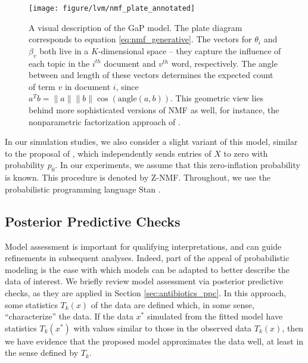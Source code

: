 \begin{figure}
  \centering
  \texttt{[image: figure/lvm/nmf\_plate\_annotated]}
  \caption{A visual description of the GaP model. The plate diagram corresponds
    to equation \ref{eq:nmf_generative}. The vectors for $\theta_i$ and
    $\beta_v$ both live in a $K$-dimensional
    space -- they capture the influence of each topic in the $i^{th}$ document and
    $v^{th}$ word, respectively. The angle between and length of these vectors
    determines the expected count of term $v$ in document
    $i$, since $a^T b = \|a\|\|b\| \cos\left(\text{angle}\left(a, b\right)\right)$.
    This geometric view lies behind more sophisticated versions of NMF as well,
    for instance, the nonparametric factorization approach of
    \citep{ren2017bayesian}.
    \label{fig:nmf_plate_annotated} }
\end{figure}

In our simulation studies, we also consider a slight variant of this model,
similar to the proposal of \citep{romero2014composition}, which independently
sends entries of $X$ to zero with probability $p_{0}$. In our experiments, we
assume that this zero-inflation probability is known. This procedure is denoted
by Z-NMF. Throughout, we use the probabilistic programming language Stan
\citep{carpenter2016stan}.

\subsection{Posterior Predictive Checks}
\label{sec:ppc_overview}

Model assessment is important for qualifying interpretations, and can guide
refinements in subsequent analyses. Indeed, part of the appeal of probabilistic
modeling is the ease with which models can be adapted to better describe the
data of interest. We briefly review model assessment via posterior predictive
checks, as they are applied in Section \ref{sec:antibiotics_ppc}. In this
approach, some statistics $T_{k}\left(x\right)$ of the data are defined which,
in some sense, ``characterize'' the data. If the data $x^{\ast}$ simulated from
the fitted model have statistics $T_{k}\left(x^{\ast}\right)$ with values
similar to those in the observed data $T_{k}\left(x\right)$, then we have
evidence that the proposed model approximates the data well, at least in the
sense defined by $T_{k}$.

